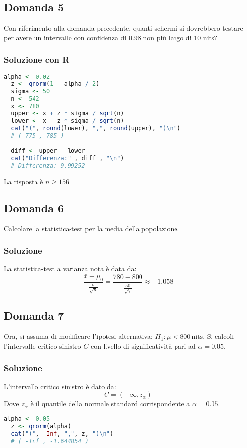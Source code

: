 \documentclass[a4paper]{article}
\theoremstyle{break}
\theoremstyle{break}
\theoremstyle{break}
\theoremstyle{break}
\begin{document}
\subsection{Domanda 5}
Con riferimento alla domanda precedente, quanti schermi si dovrebbero
testare per avere un intervallo con confidenza di 0.98 non più
largo di 10 nits?

\subsubsection{Soluzione con R}
\begin{lstlisting}[language=R]
  alpha <- 0.02
  z <- qnorm(1 - alpha / 2)
  sigma <- 50
  n <- 542
  x <- 780
  upper <- x + z * sigma / sqrt(n)
  lower <- x - z * sigma / sqrt(n)
  cat("(", round(lower), ",", round(upper), ")\n")
  # ( 775 , 785 )

  diff <- upper - lower
  cat("Differenza:" , diff , "\n")
  # Differenza: 9.99252
\end{lstlisting}
La risposta è \( n \ge 156 \) 

\subsection{Domanda 6}
Calcolare la statistica-test per la media della popolazione.

\subsubsection{Soluzione}
La statistica-test a varianza nota è data da:
\[
  \frac{\bar{x} - \mu_0}{\frac{\sigma }{\sqrt{n} }} =
\frac{780 - 800}{\frac{50}{\sqrt{7} }} \approx -1.058
\] 

\subsection{Domanda 7}
Ora, si assuma di modificare l'ipotesi alternativa: \( H_1: \mu < 800\,\text{nits} \).
Si calcoli l'intervallo critico sinistro \( C \) con livello di
significatività pari ad \( \alpha = 0.05 \).

\subsubsection{Soluzione}
L'intervallo critico sinistro è dato da:
\[
  C = (-\infty, z_{\alpha})
\]
Dove \( z_{\alpha} \) è il quantile della normale standard corrispondente
a \( \alpha = 0.05 \).
\begin{lstlisting}[language=R]
  alpha <- 0.05
  z <- qnorm(alpha)
  cat("(", -Inf, ",", z, ")\n")
  # ( -Inf , -1.644854 )
\end{lstlisting}
\end{document}
